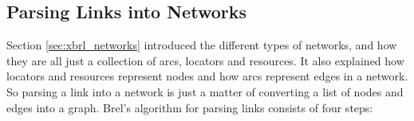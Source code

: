


\subsection{Parsing Links into Networks}

Section \ref{sec:xbrl_networks} introduced the different types of networks, and how they are all just a collection of arcs, locators and resources.
It also explained how locators and resources represent nodes and how arcs represent edges in a network.
So parsing a link into a network is just a matter of converting a list of nodes and edges into a graph.
Brel's algorithm for parsing links consists of four steps:

